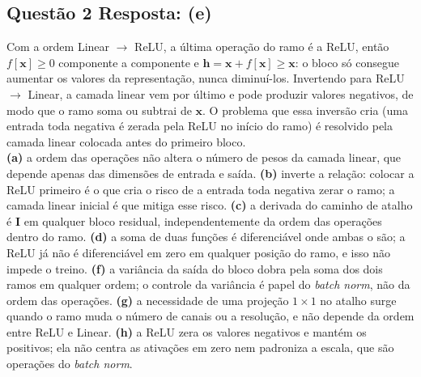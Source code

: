 \documentclass[11pt,a4paper]{article}
\begin{document}
\subsection*{Questão 2 \textemdash{} Resposta: (e)}
Com a ordem Linear $\to$ ReLU, a última operação do ramo é a ReLU, então $f[\mathbf{x}] \ge 0$ componente a componente e $\mathbf{h} = \mathbf{x} + f[\mathbf{x}] \ge \mathbf{x}$: o bloco só consegue aumentar os valores da representação, nunca diminuí-los. Invertendo para ReLU $\to$ Linear, a camada linear vem por último e pode produzir valores negativos, de modo que o ramo soma ou subtrai de $\mathbf{x}$. O problema que essa inversão cria (uma entrada toda negativa é zerada pela ReLU no início do ramo) é resolvido pela camada linear colocada antes do primeiro bloco.\\
\textbf{(a)} a ordem das operações não altera o número de pesos da camada linear, que depende apenas das dimensões de entrada e saída.
\textbf{(b)} inverte a relação: colocar a ReLU primeiro é o que cria o risco de a entrada toda negativa zerar o ramo; a camada linear inicial é que mitiga esse risco.
\textbf{(c)} a derivada do caminho de atalho é $\mathbf{I}$ em qualquer bloco residual, independentemente da ordem das operações dentro do ramo.
\textbf{(d)} a soma de duas funções é diferenciável onde ambas o são; a ReLU já não é diferenciável em zero em qualquer posição do ramo, e isso não impede o treino.
\textbf{(f)} a variância da saída do bloco dobra pela soma dos dois ramos em qualquer ordem; o controle da variância é papel do \textit{batch norm}, não da ordem das operações.
\textbf{(g)} a necessidade de uma projeção $1 \times 1$ no atalho surge quando o ramo muda o número de canais ou a resolução, e não depende da ordem entre ReLU e Linear.
\textbf{(h)} a ReLU zera os valores negativos e mantém os positivos; ela não centra as ativações em zero nem padroniza a escala, que são operações do \textit{batch norm}.
\end{document}
